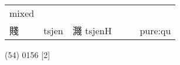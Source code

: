 \documentclass[14pt,a4paper]{scrartcl}
\begin{document}
\begin{longtable}[c]{@{}llllll@{}}
\begin{minipage}[t]{0.14\columnwidth}\raggedright\strut
mixed
\strut\end{minipage}\tabularnewline
\begin{minipage}[t]{0.14\columnwidth}\raggedright\strut
賤
\strut\end{minipage} &
\begin{minipage}[t]{0.14\columnwidth}\raggedright\strut
tsjen
\strut\end{minipage} &
\begin{minipage}[t]{0.14\columnwidth}\raggedright\strut
濺 tsjenH
\strut\end{minipage} &
\begin{minipage}[t]{0.14\columnwidth}\raggedright\strut
\strut\end{minipage} &
\begin{minipage}[t]{0.14\columnwidth}\raggedright\strut
\strut\end{minipage} &
\begin{minipage}[t]{0.14\columnwidth}\raggedright\strut
pure:qu
\strut\end{minipage}\tabularnewline
\bottomrule
\end{longtable}

(54) 0156 {[}2{]}
\end{document}
